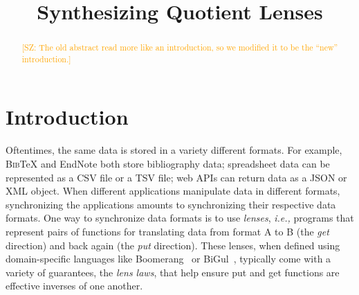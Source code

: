 \documentclass[acmsmall,review,anonymous]{acmart}\settopmatter{printfolios=true,printccs=false,printacmref=false}
\newcommand{\FINISH}[3]{\ifdraft\textcolor{#1}{[#2: #3]}\fi}
\newcommand{\saz}[1]{\FINISH{orange}{SZ}{#1}}
\newcommand{\bibtex}{\textsc{Bib}\TeX{}}
\begin{document}
\title{Synthesizing Quotient Lenses}
\begin{abstract}
\saz{The old abstract read more like an introduction, so we modified it to be
the ``new'' introduction.}
\end{abstract}

\maketitle              %

\section{Introduction}

Oftentimes, the same data is stored in a variety different formats. For
example, \bibtex{} and EndNote both store bibliography data; spreadsheet data
can be represented as a CSV file or a TSV file; web APIs can return data as a
JSON or
XML object. When different applications manipulate data in different formats,
synchronizing the applications amounts to synchronizing their respective data
formats. One way to synchronize data formats is to use \emph{lenses}, \emph{i.e.,} programs that represent pairs of functions for translating data from
format A to B (the \emph{get} direction) and back again (the \emph{put}
direction).  These lenses, when defined using domain-specific
languages like Boomerang~\cite{boomerang} or
BiGul~\cite{DBLP:conf/pepm/KoZH16}, typically come with a variety of guarantees,
the \emph{lens laws}, that help ensure put and get functions are effective
inverses of one another.
\end{document}
